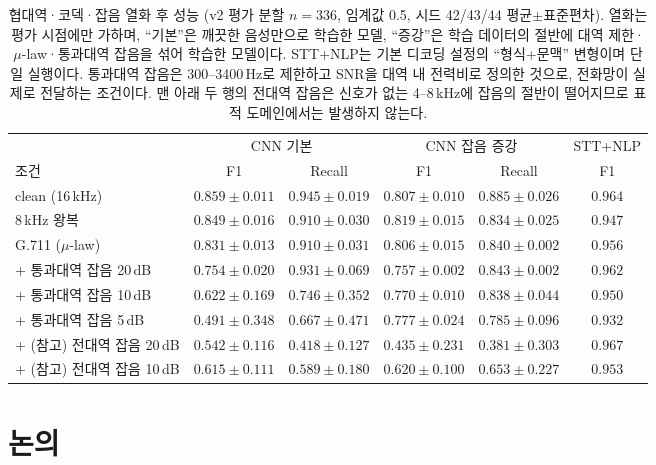 \documentclass[11pt]{article}
\begin{document}
\begin{table}[!htbp]
\centering
\caption{협대역·코덱·잡음 열화 후 성능 (v2 평가 분할 $n=336$, 임계값 0.5, 시드 42/43/44
평균$\pm$표준편차). 열화는 평가 시점에만 가하며, ``기본''은 깨끗한 음성만으로 학습한 모델,
``증강''은 학습 데이터의 절반에 대역 제한·$\mu$-law·통과대역 잡음을 섞어 학습한 모델이다.
STT+NLP는 기본 디코딩 설정의 ``형식+문맥'' 변형이며 단일 실행이다. 통과대역 잡음은
300--3400\,Hz로 제한하고 SNR을 대역 내 전력비로 정의한 것으로, 전화망이 실제로 전달하는
조건이다. 맨 아래 두 행의 전대역 잡음은 신호가 없는 4--8\,kHz에 잡음의 절반이 떨어지므로
표적 도메인에서는 발생하지 않는다.}
\label{tab:degrade}
\footnotesize
\setlength{\tabcolsep}{4pt}
\begin{tabular}{lcc|cc|c}
\toprule
 & \multicolumn{2}{c|}{CNN 기본} & \multicolumn{2}{c|}{CNN 잡음 증강} & STT+NLP \\
조건 & F1 & Recall & F1 & Recall & F1 \\
\midrule
clean (16\,kHz) & $0.859\pm0.011$ & $0.945\pm0.019$ & $0.807\pm0.010$ & $0.885\pm0.026$ & $0.964$ \\
8\,kHz 왕복 & $0.849\pm0.016$ & $0.910\pm0.030$ & $0.819\pm0.015$ & $0.834\pm0.025$ & $0.947$ \\
G.711 ($\mu$-law) & $0.831\pm0.013$ & $0.910\pm0.031$ & $0.806\pm0.015$ & $0.840\pm0.002$ & $0.956$ \\
\midrule
\;+ 통과대역 잡음 20\,dB & $0.754\pm0.020$ & $0.931\pm0.069$ & $0.757\pm0.002$ & $0.843\pm0.002$ & $0.962$ \\
\;+ 통과대역 잡음 10\,dB & $0.622\pm0.169$ & $0.746\pm0.352$ & $\mathbf{0.770\pm0.010}$ & $0.838\pm0.044$ & $0.950$ \\
\;+ 통과대역 잡음 5\,dB & $0.491\pm0.348$ & $0.667\pm0.471$ & $\mathbf{0.777\pm0.024}$ & $0.785\pm0.096$ & $0.932$ \\
\midrule
\;+ (참고) 전대역 잡음 20\,dB & $0.542\pm0.116$ & $0.418\pm0.127$ & $0.435\pm0.231$ & $0.381\pm0.303$ & $0.967$ \\
\;+ (참고) 전대역 잡음 10\,dB & $0.615\pm0.111$ & $0.589\pm0.180$ & $0.620\pm0.100$ & $0.653\pm0.227$ & $0.953$ \\
\bottomrule
\end{tabular}
\end{table}

\section{논의}\label{sec:discuss}
\end{document}

